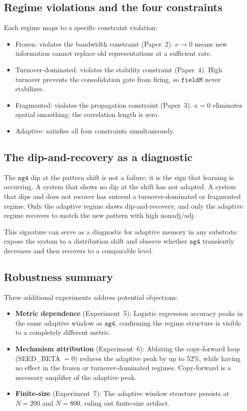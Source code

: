 \documentclass[11pt]{article}
\theoremstyle{remark}
\begin{document}
\subsection{Regime violations and the four constraints}

Each regime maps to a specific constraint violation:

\begin{itemize}
\item Frozen: violates the bandwidth constraint (Paper~2). $\nu \to 0$ means
  new information cannot replace old representations at a sufficient rate.
\item Turnover-dominated: violates the stability constraint (Paper~4). High turnover prevents
  the consolidation gate from firing, so $\mathtt{fieldM}$ never stabilizes.
\item Fragmented: violates the propagation constraint (Paper~3). $\kappa = 0$
  eliminates spatial smoothing; the correlation length is zero.
\item Adaptive: satisfies all four constraints simultaneously.
\end{itemize}

\subsection{The dip-and-recovery as a diagnostic}

The $\mathtt{sg4}$ dip at the pattern shift is not a failure; it is the sign
that learning is occurring. A system that shows no dip at the shift has not
adapted. A system that dips and does not recover has entered a turnover-dominated or fragmented regime.
Only the adaptive regime shows dip-and-recovery, and only the adaptive regime
recovers to match the new pattern with high nonadj/adj.

This signature can serve as a diagnostic for adaptive memory in any substrate:
expose the system to a distribution shift and observe whether $\mathtt{sg4}$
transiently decreases and then recovers to a comparable level.

\subsection{Robustness summary}

Three additional experiments address potential objections:
\begin{itemize}
  \item \textbf{Metric dependence} (Experiment~5): Logistic regression accuracy
    peaks in the same adaptive window as $\mathtt{sg4}$, confirming the regime
    structure is visible to a completely different metric.
  \item \textbf{Mechanism attribution} (Experiment~6): Ablating the copy-forward
    loop (SEED\_BETA $= 0$) reduces the adaptive peak by up to 52\%, while
    having no effect in the frozen or turnover-dominated regimes. Copy-forward is
    a necessary amplifier of the adaptive peak.
  \item \textbf{Finite-size} (Experiment~7): The adaptive window structure
    persists at $N = 200$ and $N = 800$, ruling out finite-size artifact.
\end{itemize}
\end{document}
